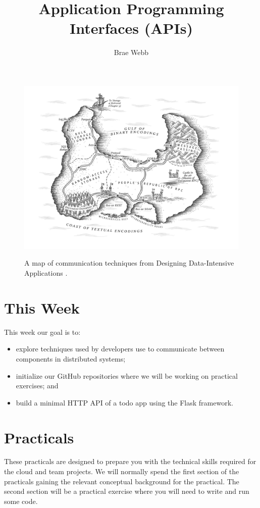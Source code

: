 \documentclass{csse4400}
\title{Application Programming Interfaces (APIs)}
\author{Brae Webb}
\date{\week{1}}
\begin{document}
\maketitle

\begin{figure}[h]
  \href{https://www.oreilly.com/library/view/designing-data-intensive-applications/9781491903063/ch04.html}{
    \includegraphics[width=\textwidth]{images/communication}
  }
\caption{A map of communication techniques from Designing Data-Intensive Applications \cite{data-intensive}.}
\end{figure}

\section{This Week}
This week our goal is to:
\begin{itemize}
  \item explore techniques used by developers use to communicate between components in distributed systems;
  \item initialize our GitHub repositories where we will be working on practical exercises; and
  \item build a minimal HTTP API of a todo app using the Flask framework.
\end{itemize}

\section{Practicals}
These practicals are designed to prepare you with the technical skills required for the cloud and team projects.
We will normally spend the first section of the practicals gaining the relevant conceptual background for the practical.
The second section will be a practical exercise where you will need to write and run some code.
\end{document}
